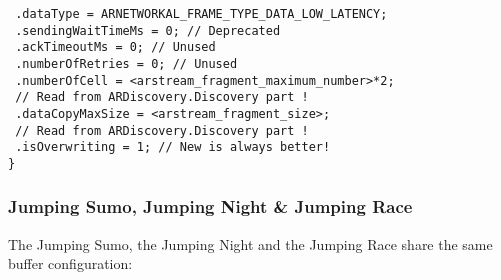 \begin{itemize}
{    \texttt{  .dataType = ARNETWORKAL\_FRAME\_TYPE\_DATA\_LOW\_LATENCY;}\\
    \texttt{  .sendingWaitTimeMs = 0; // Deprecated}\\
    \texttt{  .ackTimeoutMs = 0; // Unused}\\
    \texttt{  .numberOfRetries = 0; // Unused}\\
    \texttt{  .numberOfCell = <arstream\_fragment\_maximum\_number>*2;}\\
    \texttt{                  // Read from ARDiscovery.Discovery part !}\\
    \texttt{  .dataCopyMaxSize = <arstream\_fragment\_size>;}\\
    \texttt{                     // Read from ARDiscovery.Discovery part !}\\
    \texttt{  .isOverwriting = 1; // New is always better!}\\
    \texttt{\}}
}
\end{itemize}

\newpage

\subsubsection{Jumping Sumo, Jumping Night \& Jumping Race}

The Jumping Sumo, the Jumping Night and the Jumping Race share the same buffer configuration:

